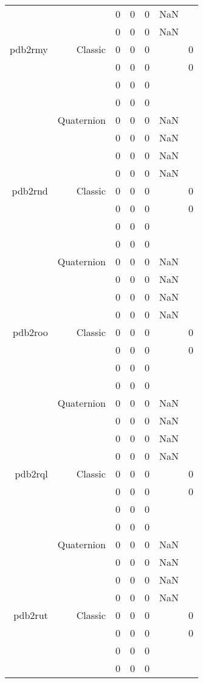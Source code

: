 \begin{xltabular}{\textwidth}{r|rcccSc}
& & 0 & 0 & 0 & NaN & \\
& & 0 & 0 & 0 & NaN & \\ \addlinespace
pdb2rmy & Classic & 0 & 0 & 0 & & 0 \\
& & 0 & 0 & 0 & & 0 \\
& & 0 & 0 & 0 & & \\
& & 0 & 0 & 0 & & \\
& Quaternion & 0 & 0 & 0 & NaN & \\
& & 0 & 0 & 0 & NaN & \\
& & 0 & 0 & 0 & NaN & \\
& & 0 & 0 & 0 & NaN & \\ \addlinespace
pdb2rnd & Classic & 0 & 0 & 0 & & 0 \\
& & 0 & 0 & 0 & & 0 \\
& & 0 & 0 & 0 & & \\
& & 0 & 0 & 0 & & \\
& Quaternion & 0 & 0 & 0 & NaN & \\
& & 0 & 0 & 0 & NaN & \\
& & 0 & 0 & 0 & NaN & \\
& & 0 & 0 & 0 & NaN & \\ \addlinespace
pdb2roo & Classic & 0 & 0 & 0 & & 0 \\
& & 0 & 0 & 0 & & 0 \\
& & 0 & 0 & 0 & & \\
& & 0 & 0 & 0 & & \\
& Quaternion & 0 & 0 & 0 & NaN & \\
& & 0 & 0 & 0 & NaN & \\
& & 0 & 0 & 0 & NaN & \\
& & 0 & 0 & 0 & NaN & \\ \addlinespace
pdb2rql & Classic & 0 & 0 & 0 & & 0 \\
& & 0 & 0 & 0 & & 0 \\
& & 0 & 0 & 0 & & \\
& & 0 & 0 & 0 & & \\
& Quaternion & 0 & 0 & 0 & NaN & \\
& & 0 & 0 & 0 & NaN & \\
& & 0 & 0 & 0 & NaN & \\
& & 0 & 0 & 0 & NaN & \\ \addlinespace
pdb2rut & Classic & 0 & 0 & 0 & & 0 \\
& & 0 & 0 & 0 & & 0 \\
& & 0 & 0 & 0 & & \\
& & 0 & 0 & 0 & & \\

\end{xltabular}
